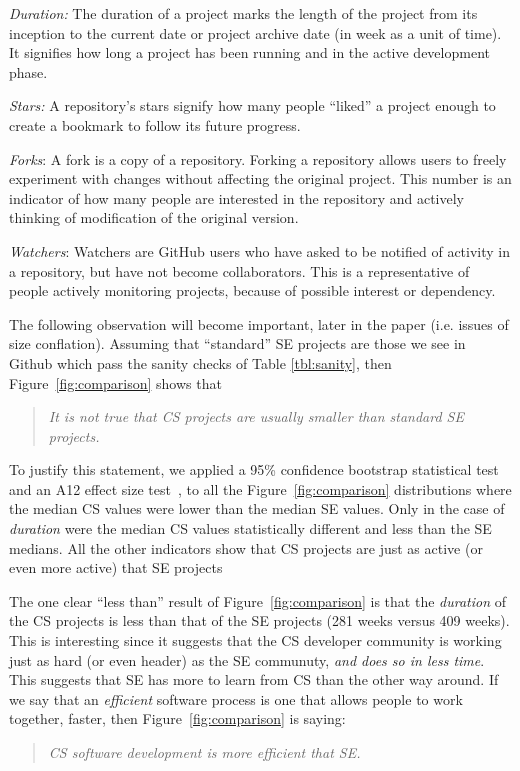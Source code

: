 \documentclass[sigconf]{acmart}
\begin{document}
\textit{Duration:} The duration of a project marks the length of the project from its inception to the current date or project archive date (in week as a unit of time). It signifies how long a project has been running and in the active development phase.





\textit{Stars:} A repository's stars signify how many people
  ``liked'' a project enough to create a bookmark to follow its future progress.
  
   \textit{Forks}: A fork is a copy of a repository. Forking a repository allows users to freely experiment with changes without affecting the original project. This number
  is an indicator of how many people are interested in the repository and actively thinking
  of modification of the original version.
  
   \textit{Watchers}: Watchers are GitHub users who have asked to be notified of activity in a repository, but have not become collaborators. This is a representative of people actively monitoring projects, because of possible interest or dependency.
   
  
  The following observation  
  will become important, later in the paper (i.e. issues of size conflation).
Assuming that ``standard'' SE projects are those we see in Github which pass the sanity checks of Table \ref{tbl:sanity}, then
 Figure~\ref{fig:comparison} shows that
  \begin{quote}
  {\em It is not true that CS projects are usually smaller than standard SE projects.}
  \end{quote}
 To justify this statement, we applied 
  a 95\% confidence bootstrap statistical test~\cite{efron94} and an A12 effect size test~\cite{arcuri2011practical}, to all the  Figure~\ref{fig:comparison} distributions where the median CS values were lower than the median SE values.
Only in the case of {\em duration} were the median CS values statistically different and less than the SE medians. All the other indicators show that CS projects are just as active (or even more active) that SE projects 

The one clear ``less than'' result of Figure~\ref{fig:comparison} is that the {\em duration} of the CS projects is less than that of the SE projects (281 weeks versus 409 weeks). 
This is interesting since it suggests
that the CS developer community is working
just as hard (or even header)
as the SE communuty, {\em and does so in less time}.
This suggests that SE has more to learn from CS than the other way around.
If we say that   an {\em efficient} software process is one that allows  people to work together, faster,  then 
Figure~\ref{fig:comparison} is saying:
\begin{quote}
{\em CS software development is  more efficient that SE.}
\end{quote} 
\end{document}
